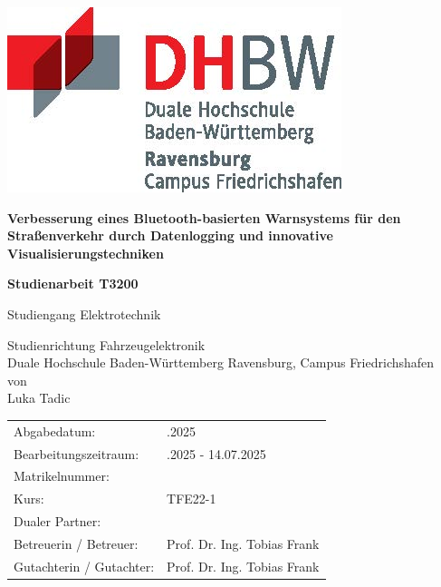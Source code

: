 \documentclass[a4paper, 12pt]{article} %
\newcommand{\titel}{Verbesserung eines Bluetooth-basierten Warnsystems für den Straßenverkehr durch Datenlogging und innovative Visualisierungstechniken}
\newcommand{\arbeit}{Studienarbeit T3200}
\newcommand{\studiengang}{Elektrotechnik}
\newcommand{\studienrichtung}{Fahrzeugelektronik}
\newcommand{\autor}{Luka Tadic}
\newcommand{\abgabe}{14.07.2025}
\newcommand{\bearbeitungszeitraum}{07.04.2025 - 14.07.2025}
\newcommand{\matrikelnr}{5726700}
\newcommand{\kurs}{TFE22-1}
\newcommand{\firma}{}
\newcommand{\betreuerfirma}{Prof. Dr. Ing. Tobias Frank}
\newcommand{\gutachterdhbw}{Prof. Dr. Ing. Tobias Frank}
\begin{document}
\sloppy

\thispagestyle{empty}  %
\hypersetup{pageanchor=false}

\begin{titlepage}
\enlargethispage{4.0cm}
\sffamily  %

\parbox{0.5\linewidth}{
    \begin{flushleft}
    \end{flushleft}
}
\parbox{0.5\linewidth}{
    \begin{flushright}
        \includegraphics[width=0.4\linewidth]{images/DHBW_d_R_FN_46mm_4c}\\[5ex]
    \end{flushright}
}

\begin{center}

{\fontsize{20.74pt}{24pt}\selectfont
\textbf{\titel}\\[1.5ex]}

{\fontsize{17pt}{20pt}\selectfont
\textbf{\arbeit}\\[2ex]}

{\fontsize{14pt}{17pt}\selectfont
Studiengang \studiengang\\[2ex]}

{\fontsize{12pt}{14pt}\selectfont
Studienrichtung \studienrichtung\\[1ex]
Duale Hochschule Baden-Württemberg Ravensburg, Campus Friedrichshafen\\[5ex]
von\\[1ex]
\autor\\[15ex]}

\end{center}

\begin{center}
{\fontsize{12pt}{14pt}\selectfont
\begin{tabular}{ll}
Abgabedatum:                    & \quad \abgabe \\  
Bearbeitungszeitraum:           & \quad \bearbeitungszeitraum \\  
Matrikelnummer:                 & \quad \matrikelnr \\  
Kurs:                           & \quad \kurs \\  
Dualer Partner:                 & \quad \firma \\ %
Betreuerin / Betreuer:          & \quad \betreuerfirma \\  
Gutachterin / Gutachter:        & \quad \gutachterdhbw \\ [2ex]
\end{tabular}
}
\end{center}


\end{titlepage}
\end{document}
